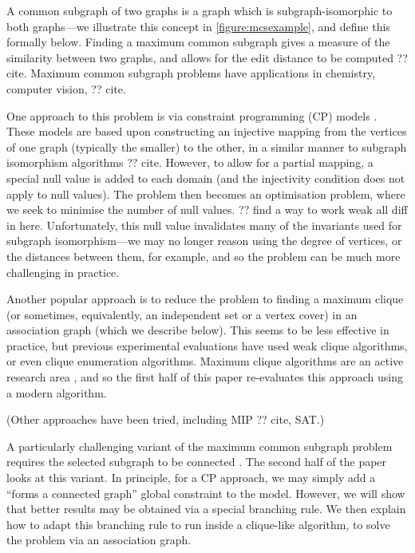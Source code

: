 \documentclass{llncs}
\begin{document}
A common subgraph of two graphs is a graph which is subgraph-isomorphic to both graphs---we
illustrate this concept in \cref{figure:mcsexample}, and define this formally below. Finding a
maximum common subgraph gives a measure of the similarity between two graphs, and allows for the
edit distance to be computed ?? cite. Maximum common subgraph problems have applications in
chemistry, computer vision, ?? cite.

One approach to this problem is via constraint programming (CP) models
\cite{DBLP:conf/cp/NdiayeS11}. These models are based upon constructing an injective mapping from
the vertices of one graph (typically the smaller) to the other, in a similar manner to subgraph
isomorphism algorithms ?? cite. However, to allow for a partial mapping, a special null value is
added to each domain (and the injectivity condition does not apply to null values). The problem then
becomes an optimisation problem, where we seek to minimise the number of null values. ?? find a way
to work weak all diff in here. Unfortunately, this null value invalidates many of the invariants
used for subgraph isomorphism---we may no longer reason using the degree of vertices, or the
distances between them, for example, and so the problem can be much more challenging in practice.

Another popular approach is to reduce the problem to finding a maximum clique (or sometimes,
equivalently, an independent set or a vertex cover) in an association graph (which we describe
below). This seems to be less effective in practice, but previous experimental evaluations have used
weak clique algorithms, or even clique enumeration algorithms. Maximum clique algorithms are an
active research area
\cite{DBLP:conf/dmtcs/TomitaS03,DBLP:journals/jgo/TomitaK07,DBLP:conf/walcom/TomitaSHTW10,DBLP:journals/cor/SegundoRJ11,DBLP:journals/algorithms/Prosser12,DBLP:journals/ol/SegundoMRH13,DBLP:conf/ictai/LiFX13,DBLP:journals/cor/SegundoT14,DBLP:conf/lion/SegundoLB14,DBLP:conf/cp/McCreeshP14,DBLP:journals/jco/BatsynGMP14,DBLP:journals/cor/SegundoNB15,DBLP:conf/lion/NikolaevBS15,DBLP:conf/lion/LiJX15,DBLP:journals/jcc/KoncDTRJ12,DBLP:journals/algorithms/McCreeshP13,DBLP:journals/topc/McCreeshP15,DBLP:journals/cor/SegundoLP16},
and so the first half of this paper re-evaluates this approach using a modern algorithm.

(Other approaches have been tried, including MIP ?? cite, SAT.)

A particularly challenging variant of the maximum common subgraph problem requires the selected
subgraph to be connected \cite{DBLP:journals/tcs/Koch01,DBLP:conf/mco/VismaraV08}. The second half
of the paper looks at this variant. In principle, for a CP approach, we may simply add a ``forms a
connected graph'' global constraint to the model. However, we will show that better results may be
obtained via a special branching rule. We then explain how to adapt this branching rule to run
inside a clique-like algorithm, to solve the problem via an association graph.
\end{document}
